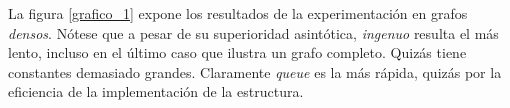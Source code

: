 La figura \ref{grafico_1} expone los resultados de la experimentación en grafos \textit{densos}. Nótese que a pesar de su superioridad asintótica, \textit{ingenuo} resulta el más lento, incluso en el último caso que ilustra un grafo completo. Quizás tiene constantes demasiado grandes. Claramente \textit{queue} es la más rápida, quizás por la eficiencia de la implementación de la estructura.

\begin{figure}[!htbp]
    $\ \ \ \ $


\end{figure}
